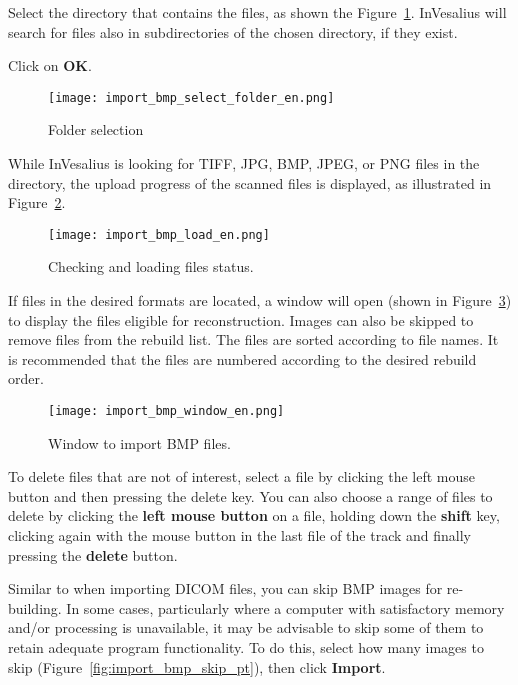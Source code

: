 Select the directory that contains the files, as shown the Figure~\ref{fig:import_bmp_select_folder}. InVesalius will search for files also in subdirectories of the chosen directory, if they exist. 

Click on \textbf{OK}.

\begin{figure}[!htb]
\centering
\texttt{[image: import\_bmp\_select\_folder\_en.png]}
\caption{Folder selection}
\label{fig:import_bmp_select_folder}
\end{figure}

While InVesalius is looking for TIFF, JPG, BMP, JPEG, or PNG files in the directory, the upload progress of the scanned files is displayed, as illustrated in Figure~\ref{fig:import_bmp_load_pt}.

\begin{figure}[!htb]
\centering
\texttt{[image: import\_bmp\_load\_en.png]}
\caption{Checking and loading files status.}
\label{fig:import_bmp_load_pt}
\end{figure}

If files in the desired formats are located, a window will open (shown in Figure~\ref{fig:import_bmp_window_pt}) to display the files eligible for reconstruction. Images can also be skipped to remove files from the rebuild list. The files are sorted according to file names. It is recommended that the files are numbered according to the desired rebuild order.

\begin{figure}[!htb]
\centering
\texttt{[image: import\_bmp\_window\_en.png]}
\caption{Window to import BMP files.}
\label{fig:import_bmp_window_pt}
\end{figure}
 
To delete files that are not of interest, select a file by clicking the left mouse button and then pressing the delete key. You can also choose a
range of files to delete by clicking the \textbf{left mouse button} on a file, holding down the \textbf{shift} key, clicking again with the mouse button in the last file of the track and finally pressing the \textbf{delete} button.

Similar to when importing DICOM files, you can skip BMP images for re-building. In some cases, particularly where a computer with satisfactory memory and/or processing is unavailable, it may be advisable to skip some of them to retain adequate program functionality. To do this, select how many images to skip (Figure~\ref{fig:import_bmp_skip_pt}), then click \textbf{Import}.

